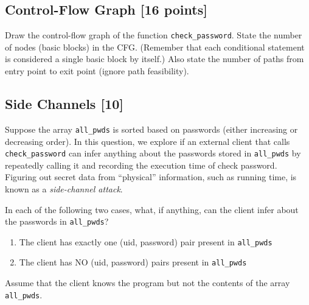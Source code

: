 \documentclass[12pt]{article}
\begin{document}
\subsection{Control-Flow Graph [16 points]}
Draw the control-flow graph of the function \texttt{check\_password}.
State the number of nodes (basic blocks) in the CFG. (Remember that each
conditional statement is considered a single basic block by itself.) Also state
the number of paths from entry point to exit point (ignore path feasibility).

\subsection{Side Channels [10]}
Suppose the array \texttt{all\_pwds} is sorted based on passwords (either
increasing or decreasing order). In this question, we explore if an external
client that calls \texttt{check\_password} can infer anything about the
passwords stored in \texttt{all\_pwds} by repeatedly calling it and recording
the execution time of check password.
Figuring out secret data from ``physical'' information, such as running time, is
known as a \textit{side-channel attack}.

In each of the following two cases, what, if anything, can the client infer about
the passwords in \texttt{all\_pwds}?
\begin{enumerate}
\item The client has exactly one (uid, password) pair present in \texttt{all\_pwds}
\item The client has NO (uid, password) pairs present in \texttt{all\_pwds}
\end{enumerate}
Assume that the client knows the program but not the contents of the array
\texttt{all\_pwds}.
\end{document}

